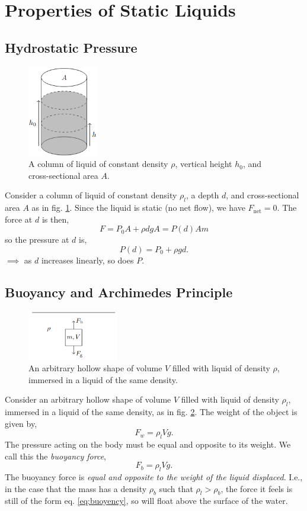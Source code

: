 \documentclass{book}
\begin{document}
\section{Properties of Static Liquids}
\subsection{Hydrostatic Pressure}
\begin{figure}
	\centering
	\includegraphics[height=150px]{hydrostatic.png}
	\caption{A column of liquid of constant density $\rho$, vertical height $h_0$, and cross-sectional area $A$.} \label{fig:hydrostatic}
\end{figure}
Consider a column of liquid of constant density $\rho_l$, a depth $d$, and cross-sectional area $A$ as in fig. \ref{fig:hydrostatic}. Since the liquid is static (no net flow), we have $F_{\text{net}} = 0$. The force at $d$ is then,
\begin{equation}
	F = P_0A + \rho d g A = P(d)Am
\end{equation}
so the pressure at $d$ is,
\begin{equation}
	\boxed{P(d) = P_0 + \rho g d}.
\end{equation}
$\implies$ as $d$ increases linearly, so does $P$.
\subsection{Buoyancy and Archimedes Principle}
\begin{figure}
	\centering
	\includegraphics[width=150px]{archimedes.png}
	\caption{An arbitrary hollow shape of volume $V$ filled with liquid of density $\rho$, immersed in a liquid of the same density.} \label{fig:archimedes}
\end{figure}
Consider an arbitrary hollow shape of volume $V$ filled with liquid of density $\rho_l$, immersed in a liquid of the same density, as in fig. \ref{fig:archimedes}. The weight of the object is given by,
\begin{equation}
	F_w = \rho_l V g.
\end{equation}
The pressure acting on the body must be equal and opposite to its weight. We call this the \textit{buoyancy force},
\begin{equation}
	\boxed{F_b = \rho_l V g}. \label{eq:buoyency}
\end{equation}
The buoyancy force is \textit{equal and opposite to the weight of the liquid displaced}. I.e., in the case that the mass has a density $\rho_b$ such that $\rho_l > \rho_b$, the force it feels is still of the form eq. \eqref{eq:buoyency}, so will float above the surface of the water.
\end{document}
